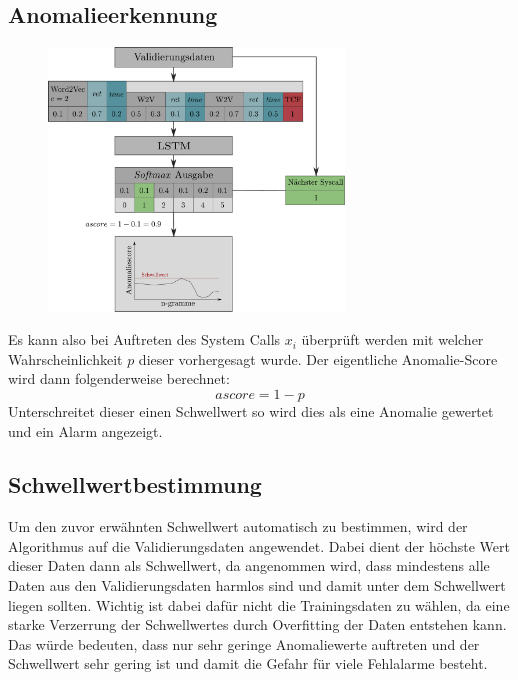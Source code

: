         \subsection{Anomalieerkennung}\label{sec:Anomalieerkennung}
            \begin{figure}
                \centering
                \includegraphics[width=0.7\textwidth]{images/Validation_overview.pdf}
                \caption{}
                \label{fig:training}
            \end{figure}
            Es kann also bei Auftreten des System Calls $x_i$ überprüft werden mit welcher Wahrscheinlichkeit $p$ dieser vorhergesagt wurde.
            Der eigentliche Anomalie-Score wird dann folgenderweise berechnet:
            \begin{equation}
                ascore = 1 - p
            \end{equation}
            Unterschreitet dieser einen Schwellwert so wird dies als eine Anomalie gewertet und ein Alarm angezeigt.
            \subsection{Schwellwertbestimmung}\label{sec:Schwellung}
            Um den zuvor erwähnten Schwellwert automatisch zu bestimmen, wird der Algorithmus auf die Validierungsdaten angewendet. 
            Dabei dient der höchste Wert dieser Daten dann als Schwellwert, da angenommen wird, dass mindestens alle Daten aus den Validierungsdaten harmlos sind und damit unter dem Schwellwert liegen sollten.
            Wichtig ist dabei dafür nicht die Trainingsdaten zu wählen, da eine starke Verzerrung der Schwellwertes durch Overfitting der Daten entstehen kann. 
            Das würde bedeuten, dass nur sehr geringe Anomaliewerte auftreten und der Schwellwert sehr gering ist und damit die Gefahr für viele Fehlalarme besteht.

